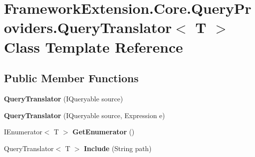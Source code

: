 \hypertarget{class_framework_extension_1_1_core_1_1_query_providers_1_1_query_translator-g}{\section{Framework\-Extension.\-Core.\-Query\-Providers.\-Query\-Translator$<$ T $>$ Class Template Reference}
\label{class_framework_extension_1_1_core_1_1_query_providers_1_1_query_translator-g}
}
\subsection*{Public Member Functions}
\begin{DoxyCompactItemize}
\item 
\hypertarget{class_framework_extension_1_1_core_1_1_query_providers_1_1_query_translator-g_a0acb6be138aba15dd0495cdffdbe5326}{{\bfseries Query\-Translator} (I\-Queryable source)}\label{class_framework_extension_1_1_core_1_1_query_providers_1_1_query_translator-g_a0acb6be138aba15dd0495cdffdbe5326}

\item 
\hypertarget{class_framework_extension_1_1_core_1_1_query_providers_1_1_query_translator-g_a99babfddea0fe29b617975fc656ad25f}{{\bfseries Query\-Translator} (I\-Queryable source, Expression e)}\label{class_framework_extension_1_1_core_1_1_query_providers_1_1_query_translator-g_a99babfddea0fe29b617975fc656ad25f}

\item 
\hypertarget{class_framework_extension_1_1_core_1_1_query_providers_1_1_query_translator-g_a9a8d9e78cfaceca5581a0c2c60d91c3e}{I\-Enumerator$<$ T $>$ {\bfseries Get\-Enumerator} ()}\label{class_framework_extension_1_1_core_1_1_query_providers_1_1_query_translator-g_a9a8d9e78cfaceca5581a0c2c60d91c3e}

\item 
\hypertarget{class_framework_extension_1_1_core_1_1_query_providers_1_1_query_translator-g_a062155910b96326e40f32f2915b6f995}{Query\-Translator$<$ T $>$ {\bfseries Include} (String path)}\label{class_framework_extension_1_1_core_1_1_query_providers_1_1_query_translator-g_a062155910b96326e40f32f2915b6f995}

\end{DoxyCompactItemize}
